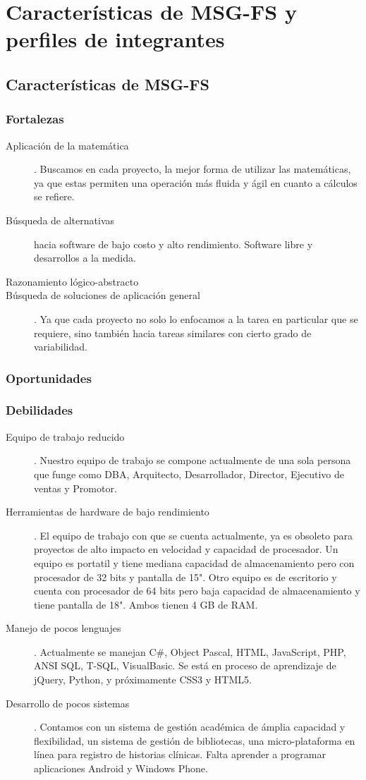 \documentclass[12pt,spanish,lettersize]{article}
\begin{document}
\section{Caracter\'isticas de MSG-FS y perfiles de integrantes}
\subsection{Caracter\'isticas de MSG-FS}
\subsubsection{Fortalezas}
\begin{description}
\item[Aplicaci\'on de la matem\'atica]. Buscamos en cada proyecto, la mejor forma de utilizar las matem\'aticas, ya que estas permiten una operaci\'on m\'as fluida y \'agil en cuanto a c\'alculos se refiere.
\item[B\'usqueda de alternativas] hacia software de bajo costo y alto rendimiento. Software libre y desarrollos a la medida.
\item[Razonamiento l\'ogico-abstracto]
\item[B\'usqueda de soluciones de aplicaci\'on general]. Ya que cada proyecto no solo lo enfocamos a la tarea en particular que se requiere, sino tambi\'en hacia tareas similares con cierto grado de variabilidad.
\end{description}
\subsubsection{Oportunidades}
\subsubsection{Debilidades}
\begin{description}
\item[Equipo de trabajo reducido]. Nuestro equipo de trabajo se compone actualmente de una sola persona que funge como DBA, Arquitecto, Desarrollador, Director, Ejecutivo de ventas y Promotor.
\item[Herramientas de hardware de bajo rendimiento]. El equipo de trabajo con que se cuenta actualmente, ya es obsoleto para proyectos de alto impacto en velocidad y capacidad de procesador. Un equipo es portatil y tiene mediana capacidad de almacenamiento pero con procesador de 32 bits y pantalla de 15". Otro equipo es de escritorio y cuenta con procesador de 64 bits pero baja capacidad de almacenamiento y tiene pantalla de 18". Ambos tienen 4 GB de RAM.
\item[Manejo de pocos lenguajes]. Actualmente se manejan C\#, Object Pascal, HTML, JavaScript, PHP, ANSI SQL, T-SQL, VisualBasic. Se est\'a en proceso de aprendizaje de jQuery, Python, y pr\'oximamente CSS3 y HTML5.
\item[Desarrollo de pocos sistemas]. Contamos con un sistema de gesti\'on acad\'emica de \'amplia capacidad y flexibilidad, un sistema de gesti\'on de bibliotecas, una micro-plataforma en l\'inea para registro de historias cl\'inicas. Falta aprender a programar aplicaciones Android y Windows Phone.
\end{description}
\end{document}
